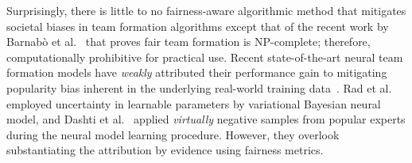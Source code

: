 \documentclass[runningheads]{llncs}
\begin{document}
Surprisingly, there is little to no fairness-aware algorithmic method that mitigates societal biases in team formation algorithms except that of the recent work by Barnabò et al.~\cite{barnabo2019algorithms} that proves fair team formation is NP-complete; therefore, computationally prohibitive for practical use. Recent state-of-the-art neural team formation models have \textit{weakly} attributed their performance gain to mitigating popularity bias inherent in the underlying real-world training data~\cite{DBLP:conf/cikm/RadFKSB20,DBLP:conf/cikm/DashtiSF22}. Rad et al. ~\cite{DBLP:conf/cikm/RadFKSB20} employed uncertainty in learnable parameters by variational Bayesian neural model, and Dashti et al.~\cite{DBLP:conf/cikm/DashtiSF22} applied \textit{virtually} negative samples from popular experts during the neural model learning procedure. However, they overlook substantiating the attribution by evidence using fairness metrics. 
\end{document}
